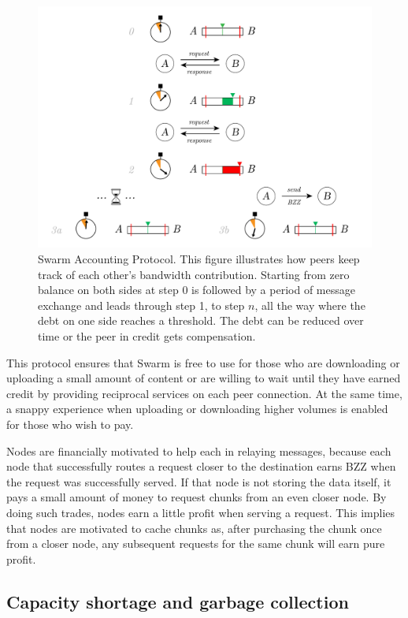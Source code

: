 \documentclass[12pt,a4paper]{article}
\begin{document}
\begin{figure}[!ht]
  \centering
    \includegraphics[width=.9\textwidth]{fig2/SWAP5.pdf}
  \caption[Swarm Accounting Protocol]{Swarm Accounting Protocol. This figure illustrates how peers keep track of each other's bandwidth contribution. Starting from zero balance on both sides at step 0 is followed by a period of message exchange and leads through step 1, to step $n$, all the way where the debt on one side reaches a threshold. The debt can be reduced over time or the peer in credit gets compensation.}
\label{fig:swap}
\end{figure}

This protocol ensures that Swarm is free to use for those who are downloading or uploading a small amount of content or are willing to wait until they have earned credit by providing reciprocal services on each peer connection. At the same time, a snappy experience when uploading or downloading higher volumes is enabled for those who wish to pay.

Nodes are financially motivated to help each in relaying messages, because each node that successfully routes a request closer to the destination earns BZZ when the request was successfully served. If that node is not storing the data itself, it pays a small amount of money to request chunks from an even closer node. By doing such trades, nodes earn a little profit when serving a request. This implies that nodes are motivated to cache chunks as, after purchasing the chunk once from a closer node, any subsequent requests for the same chunk will earn pure profit.

\subsection{Capacity shortage and garbage collection}
\end{document}
